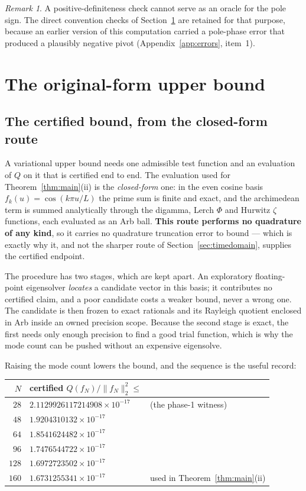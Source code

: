 \documentclass[11pt,a4paper]{article}
\theoremstyle{definition}
\theoremstyle{remark}
\newtheorem{remark}[theorem]{Remark}
\begin{document}
\begin{remark}
A positive-definiteness check cannot serve as an oracle for the pole sign. The
direct convention checks of Section~\ref{sec:upper} are retained for that
purpose, because an earlier version of this computation carried a pole-phase
error that produced a plausibly negative pivot
(Appendix~\ref{app:errors}, item~1).
\end{remark}

\section{The original-form upper bound}
\label{sec:upper}

\subsection{The certified bound, from the closed-form route}
\label{sec:upperclosed}

A variational upper bound needs one admissible test function and an evaluation
of $Q$ on it that is certified end to end. The evaluation used for
Theorem~\ref{thm:main}(ii) is the \emph{closed-form} one: in the even cosine
basis $f_k(u) = \cos(k\pi u/L)$ the prime sum is finite and exact, and the
archimedean term is summed analytically through the digamma, Lerch $\Phi$ and
Hurwitz $\zeta$ functions, each evaluated as an Arb ball. \textbf{This route
performs no quadrature of any kind}, so it carries no quadrature truncation
error to bound --- which is exactly why it, and not the sharper route of
Section~\ref{sec:timedomain}, supplies the certified endpoint.

The procedure has two stages, which are kept apart. An exploratory
floating-point eigensolver \emph{locates} a candidate vector in this basis; it
contributes no certified claim, and a poor candidate costs a weaker bound, never
a wrong one. The candidate is then frozen to exact rationals and its Rayleigh
quotient enclosed in Arb inside an owned precision scope. Because the second
stage is exact, the first needs only enough precision to find a good trial
function, which is why the mode count can be pushed without an expensive
eigensolve.

Raising the mode count lowers the bound, and the sequence is the useful record:

\begin{center}
\begin{tabular}{rll}
\toprule
$N$ & certified $Q(f_N)/\|f_N\|_2^2 \le$ & \\
\midrule
$28$  & $2.1129926117214908\times10^{-17}$ & (the phase-1 witness) \\
$48$  & $1.9204310132\times10^{-17}$ & \\
$64$  & $1.8541624482\times10^{-17}$ & \\
$96$  & $1.7476544722\times10^{-17}$ & \\
$128$ & $1.6972723502\times10^{-17}$ & \\
$160$ & $1.6731255341\times10^{-17}$ & used in Theorem~\ref{thm:main}(ii) \\
\bottomrule
\end{tabular}
\end{center}
\end{document}

